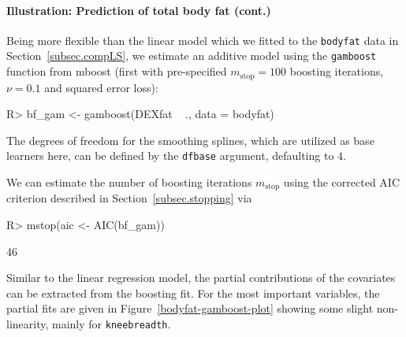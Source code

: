 \documentclass{article}
\newcommand{\Rpackage}[1]{{\normalfont\fontseries{b}\selectfont #1}}
\newcommand{\Robject}[1]{\texttt{#1}}
\newcommand{\Rcmd}[1]{\texttt{#1}}
\newenvironment{Schunk}{}{}
\begin{document}
 

\paragraph{Illustration: Prediction of total body fat (cont.)}


Being more flexible than the linear model which we fitted to the
\Robject{bodyfat} data in Section~\ref{subsec.compLS}, we estimate an additive
model 
using the \Rcmd{gamboost} function from \Rpackage{mboost} (first with
pre-specified $m_\text{stop} = 100$ 
boosting iterations, $\nu = 0.1$ and squared error loss):
\begin{Schunk}
\begin{Sinput}
R> bf_gam <- gamboost(DEXfat ~ ., data = bodyfat)
\end{Sinput}
\end{Schunk}
The degrees of freedom for the smoothing splines, which are utilized as
base learners here, 
can be defined by the \Rcmd{dfbase} argument, defaulting to $4$. 

We can estimate the number of boosting iterations $m_\text{stop}$
using the corrected AIC criterion described in
Section~\ref{subsec.stopping}
via
\begin{Schunk}
\begin{Sinput}
R> mstop(aic <- AIC(bf_gam))
\end{Sinput}
\begin{Soutput}
[1] 46
\end{Soutput}
\end{Schunk}
Similar to the linear regression model, the partial contributions of the covariates
can be extracted from the boosting fit. For the most important variables, 
the partial fits are given in Figure~\ref{bodyfat-gamboost-plot} showing some 
slight non-linearity, mainly for \Robject{kneebreadth}. 

\end{document}
